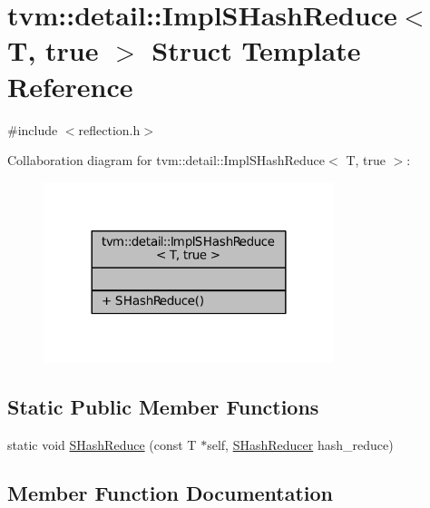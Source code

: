 \hypertarget{structtvm_1_1detail_1_1ImplSHashReduce_3_01T_00_01true_01_4}{}\section{tvm\+:\+:detail\+:\+:Impl\+S\+Hash\+Reduce$<$ T, true $>$ Struct Template Reference}
\label{structtvm_1_1detail_1_1ImplSHashReduce_3_01T_00_01true_01_4}


{\ttfamily \#include $<$reflection.\+h$>$}



Collaboration diagram for tvm\+:\+:detail\+:\+:Impl\+S\+Hash\+Reduce$<$ T, true $>$\+:
\nopagebreak
\begin{figure}[H]
\begin{center}
\leavevmode
\includegraphics[width=240pt]{structtvm_1_1detail_1_1ImplSHashReduce_3_01T_00_01true_01_4__coll__graph}
\end{center}
\end{figure}
\subsection*{Static Public Member Functions}
\begin{DoxyCompactItemize}
\item 
static void \hyperlink{structtvm_1_1detail_1_1ImplSHashReduce_3_01T_00_01true_01_4_acdcb1f161ec57ec042c6b0c70c08f94b}{S\+Hash\+Reduce} (const T $\ast$self, \hyperlink{classtvm_1_1SHashReducer}{S\+Hash\+Reducer} hash\+\_\+reduce)
\end{DoxyCompactItemize}


\subsection{Member Function Documentation}
